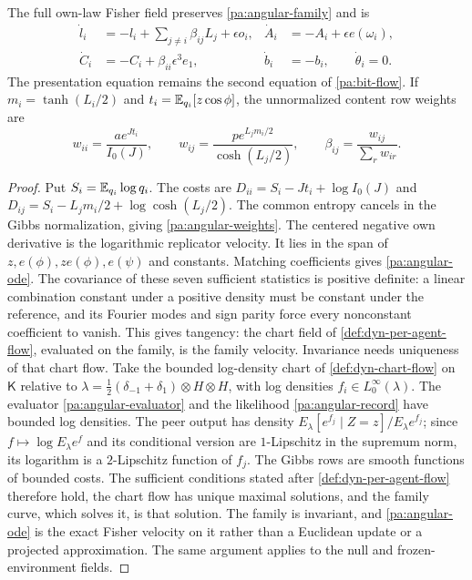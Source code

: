 The full own-law Fisher field preserves \cref{pa:angular-family} and is
\begin{equation}
 \begin{aligned}
 \dot l_i&=-l_i+\sum_{j\ne i}\beta_{ij}L_j+\epsilon o_i,&
 \dot A_i&=-A_i+\epsilon e(\omega_i),\\
 \dot C_i&=-C_i+\beta_{ii}\epsilon^3e_1,&
 \dot b_i&=-b_i,\qquad \dot\theta_i=0.
 \end{aligned}
 \label{pa:angular-ode}
\end{equation}
The presentation equation remains the second equation of \cref{pa:bit-flow}. If $m_i=\tanh(L_i/2)$ and $t_i=\mathbb E_{q_i}[z\cos\phi]$, the unnormalized content row weights are
\begin{equation}
 w_{ii}=\frac{a e^{Jt_i}}{I_0(J)},\qquad
 w_{ij}=\frac{p e^{L_jm_i/2}}{\cosh(L_j/2)},\qquad
 \beta_{ij}=\frac{w_{ij}}{\sum_r w_{ir}}.
 \label{pa:angular-weights}
\end{equation}
\begin{proof}
Put $S_i=\mathbb E_{q_i}\log q_i$. The costs are
$D_{ii}=S_i-Jt_i+\log I_0(J)$ and
$D_{ij}=S_i-L_jm_i/2+\log\cosh(L_j/2)$.
The common entropy cancels in the Gibbs normalization, giving \cref{pa:angular-weights}. The centered negative own derivative is the logarithmic replicator velocity. It lies in the span of $z,e(\phi),ze(\phi),e(\psi)$ and constants. Matching coefficients gives \cref{pa:angular-ode}. The covariance of these seven sufficient statistics is positive definite: a linear combination constant under a positive density must be constant under the reference, and its Fourier modes and sign parity force every nonconstant coefficient to vanish. This gives tangency: the chart field of \cref{def:dyn-per-agent-flow}, evaluated on the family, is the family velocity. Invariance needs uniqueness of that chart flow. Take the bounded log-density chart of \cref{def:dyn-chart-flow} on $\mathsf K$ relative to $\lambda=\tfrac12(\delta_{-1}+\delta_1)\otimes H\otimes H$, with log densities $f_i\in L^\infty_0(\lambda)$. The evaluator \cref{pa:angular-evaluator} and the likelihood \cref{pa:angular-record} have bounded log densities. The peer output has density $E_\lambda[e^{f_j}\mid Z=z]/E_\lambda e^{f_j}$; since $f\mapsto\log E_\lambda e^f$ and its conditional version are $1$-Lipschitz in the supremum norm, its logarithm is a $2$-Lipschitz function of $f_j$. The Gibbs rows are smooth functions of bounded costs. The sufficient conditions stated after \cref{def:dyn-per-agent-flow} therefore hold, the chart flow has unique maximal solutions, and the family curve, which solves it, is that solution. The family is invariant, and \cref{pa:angular-ode} is the exact Fisher velocity on it rather than a Euclidean update or a projected approximation. The same argument applies to the null and frozen-environment fields.
\end{proof}

